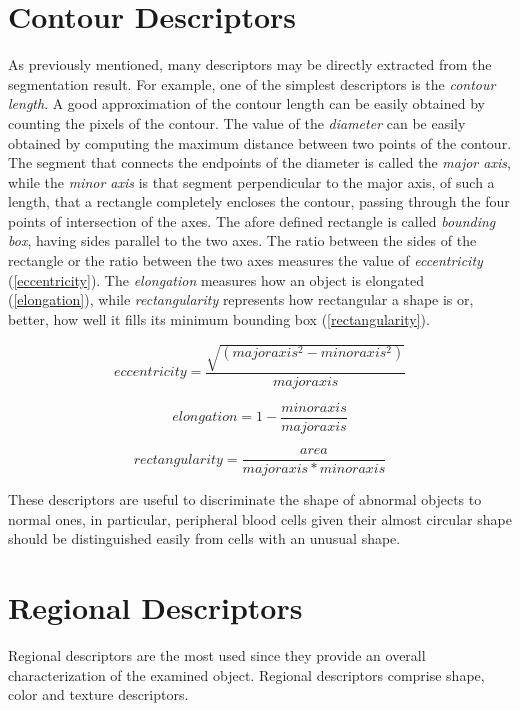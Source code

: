 \documentclass[final,a4paper,12pt,english]{UnicaPhdThesis3}
\begin{document}
\section{Contour Descriptors} %
As previously mentioned, many descriptors may be directly extracted from the segmentation result. For example, one of the simplest descriptors is the \textit{contour length}. A good approximation of the contour length can be easily obtained by counting the pixels of the contour. The value of the \textit{diameter} can be easily obtained by computing the maximum distance between two points of the contour. The segment that connects the endpoints of the diameter is called the \textit{major axis}, while the \textit{minor axis} is that segment perpendicular to the major axis, of such a length, that a rectangle completely encloses the contour, passing through the four points of intersection of the axes. The afore defined rectangle is called \textit{bounding box}, having sides parallel to the two axes. The ratio between the sides of the rectangle or the ratio between the two axes measures the value of \textit{eccentricity} (\ref{eccentricity}). The \textit{elongation} measures how an object is elongated (\ref{elongation}), while \textit{rectangularity} represents how rectangular a shape is or, better, how well it fills its minimum bounding box (\ref{rectangularity}).

\begin{equation}\label{eccentricity}
eccentricity=\frac{\sqrt{(major axis^2 - minor axis^2) }}{major axis}
\end{equation}

\begin{equation}\label{elongation}
elongation=1 - \frac{minor axis}{major axis}
\end{equation}

\begin{equation}\label{rectangularity}
rectangularity=\frac{area}{major axis*minor axis}
\end{equation}

These descriptors are useful to discriminate the shape of abnormal objects to normal ones, in particular, peripheral blood cells given their almost circular shape should be distinguished easily from cells with an unusual shape. 

\section{Regional Descriptors} %
Regional descriptors are the most used since they provide an overall characterization of the examined object. Regional descriptors comprise shape, color and texture descriptors.
\end{document}
